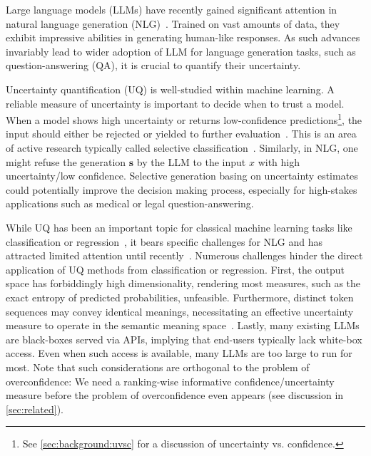 
Large language models (LLMs) have recently gained significant attention in  natural language generation (NLG)~\citep{touvron2023llama,katz2023gpt,openai2023gpt4,chowdhery2022palm}.
Trained on vast amounts of data, they exhibit impressive abilities in generating human-like responses.
As such advances invariably lead to wider adoption of LLM for language generation tasks, such as question-answering (QA), it is crucial to quantify their uncertainty.

Uncertainty quantification (UQ) is well-studied within machine learning. 
A reliable measure of uncertainty is important to decide when to trust a model. 
When a model shows high uncertainty or returns low-confidence predictions\footnote{See \cref{sec:background:uvsc} for a discussion of uncertainty vs. confidence.}, the input should either be rejected or yielded to further evaluation~\citep{mcdp}.
This is an area of active research typically called selective classification~\citep{Chow1970OnTradeoff,lin2022scrib,Geifman2017SelectiveNetworks}. 
Similarly, in NLG, one might refuse the generation $\mathbf{s}$ by the LLM to the input $x$ with high uncertainty/low confidence. 
Selective generation basing on uncertainty estimates could potentially improve the decision making process, especially for high-stakes applications such as medical or legal question-answering.

While UQ has been an important topic for classical machine learning tasks like classification or regression~\citep{Lakshminarayanan2017SimpleEnsembles,mcdp,DBLP:conf/icml/Hernandez-Lobato15b,ABDAR2021243}, it bears specific challenges for NLG and has attracted limited attention until recently~\citep{Lin2022TeachingMT,kuhn2023semantic,malinin2021uncertainty}. 
Numerous challenges hinder the direct application of UQ methods from classification or regression. 
First, the output space has forbiddingly high dimensionality, rendering most measures, such as the exact entropy of predicted probabilities, unfeasible. 
Furthermore, distinct token sequences may convey identical meanings, necessitating an effective uncertainty measure to operate in the semantic meaning space~\citep{kuhn2023semantic}. 
Lastly, many existing LLMs are black-boxes served via APIs, implying that end-users typically lack white-box access. 
Even when such access is available, many LLMs are too large to run for most. 
Note that such considerations are orthogonal to the problem of overconfidence: We need a ranking-wise informative confidence/uncertainty measure before the problem of overconfidence even appears (see discussion in \cref{sec:related}).


